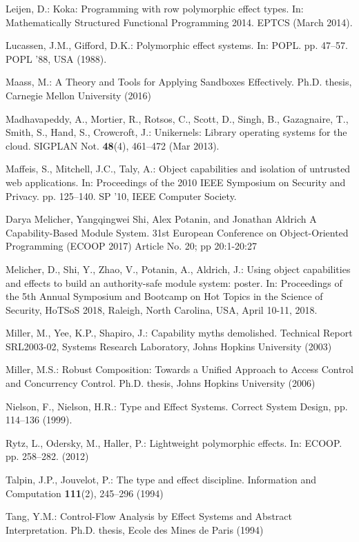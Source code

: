 \documentclass[runningheads]{llncs}
\begin{document}
\begin{thebibliography}{10}
Leijen, D.: Koka: Programming with row polymorphic effect types. In:
  Mathematically Structured Functional Programming 2014. EPTCS (March 2014).

Lucassen, J.M., Gifford, D.K.: Polymorphic effect systems. In: POPL.
  pp. 47--57. POPL '88, USA (1988).

Maass, M.: {A Theory and Tools for Applying Sandboxes Effectively}. Ph.D.
  thesis, Carnegie Mellon University (2016)

Madhavapeddy, A., Mortier, R., Rotsos, C., Scott, D., Singh, B., Gazagnaire,
  T., Smith, S., Hand, S., Crowcroft, J.: Unikernels: Library operating systems
  for the cloud. SIGPLAN Not.  \textbf{48}(4),  461--472 (Mar 2013).

Maffeis, S., Mitchell, J.C., Taly, A.: Object capabilities and isolation of
  untrusted web applications. In: Proceedings of the 2010 IEEE Symposium on
  Security and Privacy. pp. 125--140. SP '10, IEEE Computer Society.

Darya Melicher, Yangqingwei Shi, Alex Potanin, and Jonathan Aldrich
A Capability-Based Module System.
31st European Conference on Object-Oriented Programming (ECOOP 2017)
Article No. 20; pp 20:1-20:27

Melicher, D., Shi, Y., Zhao, V., Potanin, A., Aldrich, J.: Using object
capabilities and effects to build an authority-safe module system:
poster. In: Proceedings of the 5th Annual Symposium and Bootcamp on Hot
Topics in the Science of Security, HoTSoS 2018, Raleigh, North Carolina, USA,
April 10-11, 2018.

Miller, M., Yee, K.P., Shapiro, J.: Capability myths demolished.
 Technical Report SRL2003-02, Systems Research Laboratory, Johns Hopkins University (2003)

Miller, M.S.: Robust Composition: Towards a Unified Approach to Access Control
  and Concurrency Control. Ph.D. thesis, Johns Hopkins University (2006)

Nielson, F., Nielson, H.R.: {Type and Effect Systems}. Correct System Design, pp. 114--136 (1999).

Rytz, L., Odersky, M., Haller, P.: Lightweight polymorphic effects. In: ECOOP.
  pp. 258--282. (2012)

Talpin, J.P., Jouvelot, P.: The type and effect discipline. Information and
  Computation  \textbf{111}(2),  245--296 (1994)

Tang, Y.M.: Control-Flow Analysis by Effect Systems and Abstract
  Interpretation. Ph.D. thesis, Ecole des Mines de Paris (1994)

\end{thebibliography}
\end{document}
